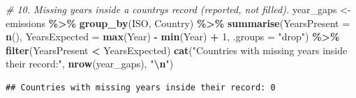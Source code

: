 \documentclass[
]{article}
\newenvironment{Shaded}{\begin{snugshade}}{\end{snugshade}}
\newcommand{\AttributeTok}[1]{\textcolor[rgb]{0.13,0.29,0.53}{#1}}
\newcommand{\CommentTok}[1]{\textcolor[rgb]{0.56,0.35,0.01}{\textit{#1}}}
\newcommand{\DecValTok}[1]{\textcolor[rgb]{0.00,0.00,0.81}{#1}}
\newcommand{\FunctionTok}[1]{\textcolor[rgb]{0.13,0.29,0.53}{\textbf{#1}}}
\newcommand{\NormalTok}[1]{#1}
\newcommand{\OtherTok}[1]{\textcolor[rgb]{0.56,0.35,0.01}{#1}}
\newcommand{\SpecialCharTok}[1]{\textcolor[rgb]{0.81,0.36,0.00}{\textbf{#1}}}
\newcommand{\StringTok}[1]{\textcolor[rgb]{0.31,0.60,0.02}{#1}}
\begin{document}
\begin{Shaded}
\begin{Highlighting}[]
\CommentTok{\# 10. Missing years inside a country\textquotesingle{}s record (reported, not filled).}
\NormalTok{year\_gaps }\OtherTok{\textless{}{-}}\NormalTok{ emissions }\SpecialCharTok{\%\textgreater{}\%}
  \FunctionTok{group\_by}\NormalTok{(ISO, Country) }\SpecialCharTok{\%\textgreater{}\%}
  \FunctionTok{summarise}\NormalTok{(}\AttributeTok{YearsPresent =} \FunctionTok{n}\NormalTok{(),}
            \AttributeTok{YearsExpected =} \FunctionTok{max}\NormalTok{(Year) }\SpecialCharTok{{-}} \FunctionTok{min}\NormalTok{(Year) }\SpecialCharTok{+} \DecValTok{1}\NormalTok{, }\AttributeTok{.groups =} \StringTok{"drop"}\NormalTok{) }\SpecialCharTok{\%\textgreater{}\%}
  \FunctionTok{filter}\NormalTok{(YearsPresent }\SpecialCharTok{\textless{}}\NormalTok{ YearsExpected)}
\FunctionTok{cat}\NormalTok{(}\StringTok{"Countries with missing years inside their record:"}\NormalTok{, }\FunctionTok{nrow}\NormalTok{(year\_gaps),}
    \StringTok{"}\SpecialCharTok{\textbackslash{}n}\StringTok{"}\NormalTok{)}
\end{Highlighting}
\end{Shaded}

\begin{verbatim}
## Countries with missing years inside their record: 0
\end{verbatim}
\end{document}

